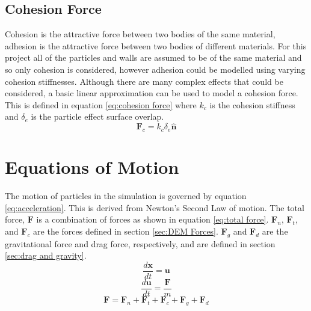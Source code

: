 \documentclass[10pt,a4paper,titlepage]{report}
\begin{document}
\subsection{Cohesion Force}
Cohesion is the attractive force between two bodies of the same material, adhesion is the attractive force between two bodies of different materials. For this project all of the particles and walls are assumed to be of the same material and so only cohesion is considered, however adhesion could be modelled using varying cohesion stiffnesses. Although there are many complex effects that could be considered\cite{tuley}, a basic linear approximation can be used to model a cohesion force. This is defined in equation \ref{eq:cohesion force} where $k_c$ is the cohesion stiffness and $\delta_e$ is the particle effect surface overlap.
\begin{equation}
\mathbf{F}_{c} = k_{c} \delta_{e} \mathbf{\hat{n}}
\label{eq:cohesion force}
\end{equation}
\section{Equations of Motion}
The motion of particles in the simulation is governed by equation \ref{eq:acceleration}. This is derived from Newton's Second Law of motion. The total force, $\mathbf{F}$ is a combination of forces as shown in equation \ref{eq:total force}. $\mathbf{F}_{n}$, $\mathbf{F}_{t}$, and $\mathbf{F}_{c}$ are the forces defined in section \ref{sec:DEM Forces}. $\mathbf{F}_{g}$ and $\mathbf{F}_{d}$ are the gravitational force and drag force, respectively, and are defined in section \ref{sec:drag and gravity}.
\begin{equation}
\dfrac{d\mathbf{x}}{dt} = \mathbf{u}
\label{eq:position}
\end{equation}
\begin{equation}
\dfrac{d\mathbf{u}}{dt} = \dfrac{\mathbf{F}}{m}
\label{eq:acceleration}
\end{equation}
\begin{equation}
\mathbf{F} = \mathbf{F}_{n} + \mathbf{F}_{t} + \mathbf{F}_{c} + \mathbf{F}_{g} + \mathbf{F}_{d}
\label{eq:total force}
\end{equation}
\end{document}
